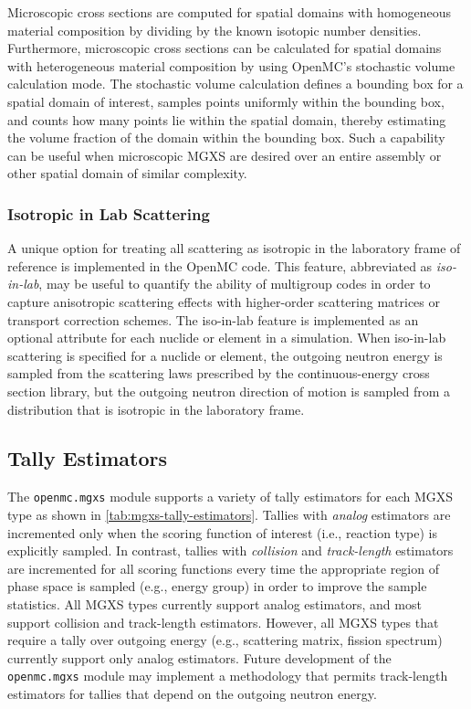 Microscopic cross sections are computed for spatial domains with homogeneous material composition by dividing by the known isotopic number densities. Furthermore, microscopic cross sections can be calculated for spatial domains with heterogeneous material composition by using OpenMC's stochastic volume calculation mode. The stochastic volume calculation defines a bounding box for a spatial domain of interest, samples points uniformly within the bounding box, and counts how many points lie within the spatial domain, thereby estimating the volume fraction of the domain within the bounding box. Such a capability can be useful when microscopic MGXS are desired over an entire assembly or other spatial domain of similar complexity.

\subsubsection{Isotropic in Lab Scattering}
\label{subsec:iso-in-lab}

A unique option for treating all scattering as isotropic in the laboratory frame of reference is implemented in the OpenMC code. This feature, abbreviated as \emph{iso-in-lab}, may be useful to quantify the ability of multigroup codes in order to capture anisotropic scattering effects with higher-order scattering matrices or transport correction schemes. The iso-in-lab feature is implemented as an optional attribute for each nuclide or element in a simulation. When iso-in-lab scattering is specified for a nuclide or element, the outgoing neutron energy is sampled from the scattering laws prescribed by the continuous-energy cross section library, but the outgoing neutron direction of motion is sampled from a distribution that is isotropic in the laboratory frame.

\subsection{Tally Estimators}
\label{subsec:tally-est}

The \texttt{openmc.mgxs} module supports a variety of tally estimators for each MGXS type as shown in \cref{tab:mgxs-tally-estimators}. Tallies with \textit{analog} estimators are incremented only when the scoring function of interest (\textrm{i.e.}, reaction type) is explicitly sampled. In contrast, tallies with \textit{collision} and \textit{track-length} estimators are incremented for all scoring functions every time the appropriate region of phase space is sampled (\textrm{e.g.}, energy group) in order to improve the sample statistics. All MGXS types currently support analog estimators, and most support collision and track-length estimators. However, all MGXS types that require a tally over outgoing energy (\textrm{e.g.}, scattering matrix, fission spectrum) currently support only analog estimators. Future development of the \texttt{openmc.mgxs} module may implement a methodology\cite{nelson2014improved} that permits track-length estimators for tallies that depend on the outgoing neutron energy.

